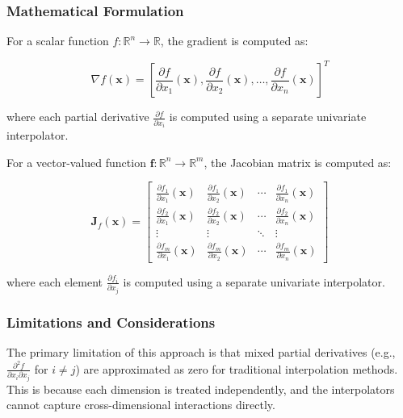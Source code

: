\documentclass[11pt,a4paper]{article}
\begin{document}
\subsubsection{Mathematical Formulation}

For a scalar function $f: \mathbb{R}^n \rightarrow \mathbb{R}$, the gradient is computed as:

\begin{equation}
\nabla f(\mathbf{x}) = \left[\frac{\partial f}{\partial x_1}(\mathbf{x}), \frac{\partial f}{\partial x_2}(\mathbf{x}), \ldots, \frac{\partial f}{\partial x_n}(\mathbf{x})\right]^T
\end{equation}

where each partial derivative $\frac{\partial f}{\partial x_i}$ is computed using a separate univariate interpolator.

For a vector-valued function $\mathbf{f}: \mathbb{R}^n \rightarrow \mathbb{R}^m$, the Jacobian matrix is computed as:

\begin{equation}
\mathbf{J}_f(\mathbf{x}) = \begin{bmatrix}
\frac{\partial f_1}{\partial x_1}(\mathbf{x}) & \frac{\partial f_1}{\partial x_2}(\mathbf{x}) & \cdots & \frac{\partial f_1}{\partial x_n}(\mathbf{x}) \\
\frac{\partial f_2}{\partial x_1}(\mathbf{x}) & \frac{\partial f_2}{\partial x_2}(\mathbf{x}) & \cdots & \frac{\partial f_2}{\partial x_n}(\mathbf{x}) \\
\vdots & \vdots & \ddots & \vdots \\
\frac{\partial f_m}{\partial x_1}(\mathbf{x}) & \frac{\partial f_m}{\partial x_2}(\mathbf{x}) & \cdots & \frac{\partial f_m}{\partial x_n}(\mathbf{x})
\end{bmatrix}
\end{equation}

where each element $\frac{\partial f_i}{\partial x_j}$ is computed using a separate univariate interpolator.

\subsubsection{Limitations and Considerations}

The primary limitation of this approach is that mixed partial derivatives (e.g., $\frac{\partial^2 f}{\partial x_i \partial x_j}$ for $i \neq j$) are approximated as zero for traditional interpolation methods. This is because each dimension is treated independently, and the interpolators cannot capture cross-dimensional interactions directly.
\end{document}
